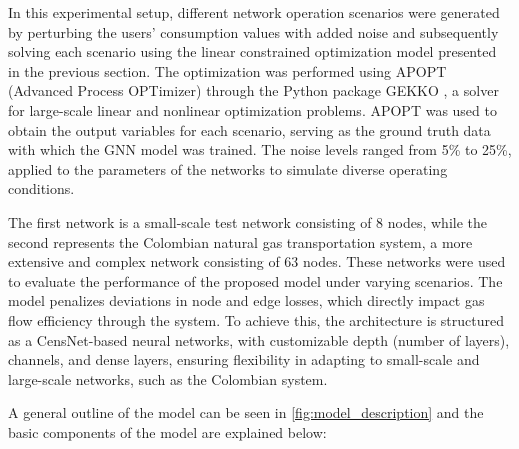 In this experimental setup, different network operation scenarios were generated by perturbing the users' consumption values with added noise and subsequently solving each scenario using the linear constrained optimization model presented in the previous section. The optimization was performed using APOPT (Advanced Process OPTimizer) through the Python package GEKKO \cite{Beal_Hill_Martin_Hedengren_2018}, a solver for large-scale linear and nonlinear optimization problems. APOPT was used to obtain the output variables for each scenario, serving as the ground truth data with which the GNN model was trained. The noise levels ranged from 5\% to 25\%, applied to the parameters of the networks to simulate diverse operating conditions. 


The first network is a small-scale test network consisting of 8 nodes, while the second represents the Colombian natural gas transportation system, a more extensive and complex network consisting of 63 nodes. These networks were used to evaluate the performance of the proposed model under varying scenarios. The model penalizes deviations in node and edge losses, which directly impact gas flow efficiency through the system. To achieve this, the architecture is structured as a CensNet-based neural networks, with customizable depth (number of layers), channels, and dense layers, ensuring flexibility in adapting to small-scale and large-scale networks, such as the Colombian system.

A general outline of the model can be seen in \cref{fig:model_description} and the basic components of the model are explained below:

